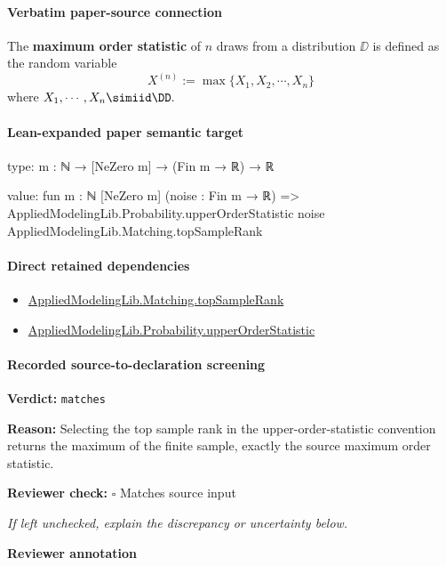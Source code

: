 \documentclass[10pt]{article}
\newcommand{\reviewerbox}{%
  \par\noindent\fbox{\parbox{0.96\linewidth}{\rule{0pt}{0.38in}}}\par
}
\newcommand{\reviewmatch}[1]{%
  \par\noindent\textbf{Reviewer check:} $\square$\; #1\par
  \noindent\emph{If left unchecked, explain the discrepancy or uncertainty below.}\par
}
\begin{document}
\paragraph{Verbatim paper-source connection}
\begin{ReviewVerbatim}
\begin{definition}
    The \textbf{maximum order statistic} of $n$ draws from a distribution $\DD$ is defined as the random variable
    \begin{equation}
        X^{(n)} := \max \{X_1, X_2, \cdots, X_n\}
    \end{equation}
    where $X_1, \cdots, X_n\simiid \DD.$
\end{definition}
\end{ReviewVerbatim}



\paragraph{Lean-expanded paper semantic target}
\begin{ReviewVerbatim}
type:
{m : ℕ} → [NeZero m] → (Fin m → ℝ) → ℝ

value:
fun {m : ℕ} [NeZero m] (noise : Fin m → ℝ) =>
  AppliedModelingLib.Probability.upperOrderStatistic noise AppliedModelingLib.Matching.topSampleRank
\end{ReviewVerbatim}

\paragraph{Direct retained dependencies}
\begin{itemize}\raggedright
\item \hyperlink{governing-declaration-7a1dfdd67a422983}{Applied\allowbreak{}Modeling\allowbreak{}Lib.\allowbreak{}Matching.\allowbreak{}top\allowbreak{}Sample\allowbreak{}Rank}
\item \hyperlink{governing-declaration-cdeff774dc07136a}{Applied\allowbreak{}Modeling\allowbreak{}Lib.\allowbreak{}Probability.\allowbreak{}upper\allowbreak{}Order\allowbreak{}Statistic}
\end{itemize}
\paragraph{Recorded source-to-declaration screening}
\textbf{Verdict:} \texttt{matches}
\\
{\raggedright
\textbf{Reason:} Selecting the top sample rank in the upper-\allowbreak{}order-\allowbreak{}statistic convention returns the maximum of the finite sample, exactly the source maximum order statistic.\allowbreak{}
\par}
\reviewmatch{Matches source input}
\noindent\textbf{Reviewer annotation}\par
\reviewerbox
\clearpage
\hypertarget{paper-prerequisite-9b09ee190ab81202}{}
\end{document}
